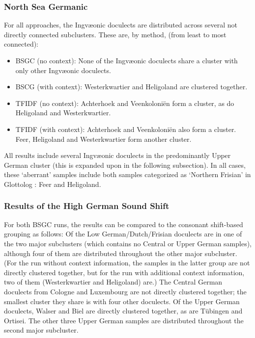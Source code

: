 \documentclass[a4paper]{article}
\begin{document}
\subsubsection{North Sea Germanic}

For all approaches, the Ingv\ae{}onic doculects
are distributed across several not directly connected subclusters.
These are, by method, (from least to most connected):

\begin{itemize}
\item
BSGC (no context):
None of the Ingv\ae{}onic doculects share a cluster
with only other Ingv\ae{}onic doculects.

\item
BSCG (with context):
Westerkwartier and Heligoland are clustered together.

\item
TFIDF (no context):
Achterhoek and Veenkoloni\"{e}n form a cluster,
as do Heligoland and Westerkwartier.

\item
TFIDF (with context):
Achterhoek and Veenkoloni\"{e}n also form a cluster.
Feer, Heligoland and Westerkwartier form another cluster.
\end{itemize}

All results include several Ingv\ae{}onic doculects
in the predominantly Upper German cluster
(this is expanded upon in the following subsection).
In all cases, these `aberrant' %
samples include both samples categorized as `Northern Frisian'
in Glottolog \citep{hammarstroem2018glottolog}: Feer and Heligoland.


\subsubsection{Results of the High German Sound Shift}

For both BSGC runs, the results can be compared to the consonant shift-based grouping as follows:
Of the Low German/Dutch/Frisian doculects are in
one of the two major subclusters %
(which contains no Central or Upper German samples),
although four of them are distributed throughout the other major subcluster.
(For the run without context information,
the samples in the latter group are not directly clustered together,
but for the run with additional context information,
two of them (Westerkwartier and Heligoland) are.)
The Central German doculects from Cologne and Luxembourg
are not directly clustered together; the smallest cluster they share
is with four other doculects.
Of the Upper German doculects,
Walser and Biel are directly clustered together,
as are T\"{u}bingen and Ortisei.
The other three Upper German samples are distributed throughout
the second major subcluster.
\end{document}
